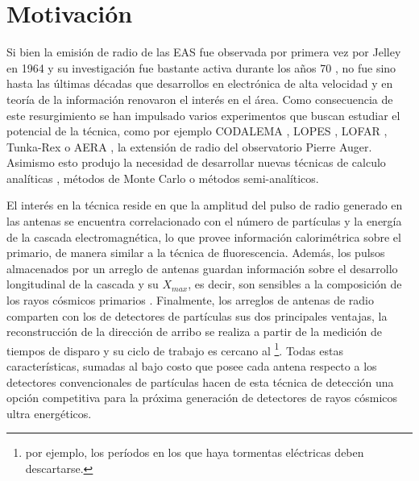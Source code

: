 \chapter{Motivaci\'on}
\label{ch:motRadio}

Si bien la emisi\'on de radio de las EAS fue observada por primera vez por Jelley en 1964 \cite{jelley1966radio} y su investigaci\'on fue bastante activa durante los a\~nos 70 \cite{allan1971progress}, no fue sino hasta las \'ultimas d\'ecadas que desarrollos en electr\'onica de alta velocidad y en teor\'ia de la informaci\'on renovaron el inter\'es en el \'area.
Como consecuencia de este resurgimiento se han impulsado varios experimentos que buscan estudiar el potencial de la t\'ecnica, como por ejemplo CODALEMA \cite{ardouin2005radio}, LOPES \cite{huege2012lopes}, LOFAR \cite{horandel2009lofar}, Tunka-Rex \cite{schroder2013tunka} o AERA \cite{kelley2011aera}, la extensi\'on de radio del observatorio Pierre Auger.
Asimismo esto produjo la necesidad de desarrollar nuevas t\'ecnicas de calculo anal\'iticas \cite{huege2003radio,scholten2008macroscopic}, m\'etodos de Monte Carlo \cite{huege2007monte,ludwig2011reas3} o m\'etodos semi-anal\'iticos\cite{scholten2009macroscopic}.

El interés en la técnica reside en que la amplitud del pulso de radio generado en las antenas se encuentra correlacionado con el número de partículas y la energía de la cascada electromagnética, lo que provee información calorimétrica sobre el primario, de manera similar a la técnica de fluorescencia.
Adem\'as, los pulsos almacenados por un arreglo de antenas guardan información sobre el desarrollo longitudinal de la cascada y su $X_{max}$, es decir, son sensibles a la composici\'on de los rayos c\'osmicos primarios \cite{cite:hauge_rec,cite:lofar_rec}.
Finalmente, los arreglos de antenas de radio comparten con los de detectores de partículas sus dos principales ventajas, la reconstrucción de la dirección de arribo se realiza a partir de la medición de tiempos de disparo y su ciclo de trabajo es cercano al \footnote{por ejemplo, los períodos en los que haya tormentas eléctricas deben descartarse.}.
Todas estas características, sumadas al bajo costo que posee cada antena respecto a los detectores convencionales de partículas hacen de esta técnica de detección una opción competitiva para la próxima generación de detectores de rayos c\'osmicos ultra energ\'eticos.

